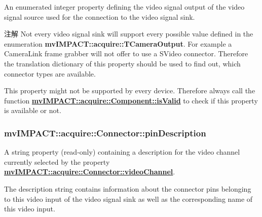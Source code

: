 An enumerated integer property defining the video signal output of the video signal source used for the connection to the video signal sink. 

\begin{DoxyNote}{注解}
Not every video signal sink will support every possible value defined in the enumeration {\bfseries mv\+I\+M\+P\+A\+C\+T\+::acquire\+::\+T\+Camera\+Output}. For example a Camera\+Link\textregistered{} frame grabber will not offer to use a S\+Video connector. Therefore the translation dictionary of this property should be used to find out, which connector types are available.

This property might not be supported by every device. Therefore always call the function {\bfseries \hyperlink{classmv_i_m_p_a_c_t_1_1acquire_1_1_component_ac51e55e7e046101f3c6119d84123abd5}{mv\+I\+M\+P\+A\+C\+T\+::acquire\+::\+Component\+::is\+Valid}} to check if this property is available or not. 
\end{DoxyNote}
\hypertarget{classmv_i_m_p_a_c_t_1_1acquire_1_1_connector_a820c1d3a103073ada11d790b7c63b428}{
\subsubsection[{pin\+Description}]{ mv\+I\+M\+P\+A\+C\+T\+::acquire\+::\+Connector\+::pin\+Description}}\label{classmv_i_m_p_a_c_t_1_1acquire_1_1_connector_a820c1d3a103073ada11d790b7c63b428}


A string property {\bfseries }(read-\/only) containing a description for the video channel currently selected by the property {\bfseries \hyperlink{classmv_i_m_p_a_c_t_1_1acquire_1_1_connector_a22c033da953a263629c4dcf410cfab30}{mv\+I\+M\+P\+A\+C\+T\+::acquire\+::\+Connector\+::video\+Channel}}. 

The description string contains information about the connector pins belonging to this video input of the video signal sink as well as the corresponding name of this video input.

